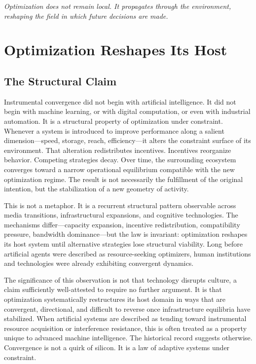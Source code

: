 \documentclass[12pt, oneside]{book}
\theoremstyle{plain}
\theoremstyle{definition}
\theoremstyle{remark}
\theoremstyle{definition}
\begin{document}
\epigraph{\itshape Optimization does not remain local. It propagates through the
environment, reshaping the field in which future decisions are made.}{}

\chapter{Optimization Reshapes Its Host}
\label{ch:host}

\section{The Structural Claim}

Instrumental convergence did not begin with artificial intelligence. It did not
begin with machine learning, or with digital computation, or even with industrial
automation. It is a structural property of optimization under constraint. Whenever
a system is introduced to improve performance along a salient dimension---speed,
storage, reach, efficiency---it alters the constraint surface of its environment.
That alteration redistributes incentives. Incentives reorganize behavior. Competing
strategies decay. Over time, the surrounding ecosystem converges toward a narrow
operational equilibrium compatible with the new optimization regime. The result is
not necessarily the fulfillment of the original intention, but the stabilization of
a new geometry of activity.

This is not a metaphor. It is a recurrent structural pattern observable across media
transitions, infrastructural expansions, and cognitive technologies. The mechanisms
differ---capacity expansion, incentive redistribution, compatibility pressure,
bandwidth dominance---but the law is invariant: optimization reshapes its host system
until alternative strategies lose structural viability. Long before artificial agents
were described as resource-seeking optimizers, human institutions and technologies were
already exhibiting convergent dynamics.

The significance of this observation is not that technology disrupts culture, a claim
sufficiently well-attested to require no further argument. It is that optimization
systematically restructures its host domain in ways that are convergent, directional,
and difficult to reverse once infrastructure equilibria have stabilized. When artificial
systems are described as tending toward instrumental resource acquisition or interference
resistance, this is often treated as a property unique to advanced machine intelligence.
The historical record suggests otherwise. Convergence is not a quirk of silicon. It
is a law of adaptive systems under constraint.
\end{document}
